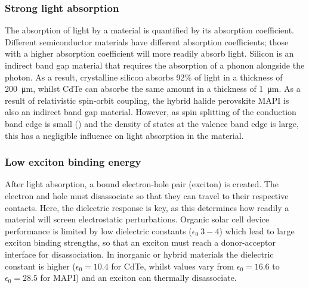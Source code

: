 \subsubsection{Strong light absorption}
The absorption of light by a material is quantified by its absorption coefficient. Different semiconductor materials have different absorption coefficients; those with a higher absorption coefficient will more readily absorb light. Silicon is an indirect band gap material that requires the absorption of a phonon alongside the photon. As a result, crystalline silicon absorbs 92\% of light in a thickness of  \SI{200}{\micro\metre}, whilst CdTe can absorbe the same amount in a thickness of \SI{1}{\micro\metre}.\autocite{Poortmans2006} As a result of relativistic spin-orbit coupling, the hybrid halide perovskite MAPI is also an indirect band gap material. However, as spin splitting of the conduction band edge is small () and the density of states at the valence band edge is large, this has a negligible influence on light absorption in the material.\autocite{Azarhoosh2016}

\subsubsection{Low exciton binding energy}
After light absorption, a bound electron-hole pair (exciton) is created. The electron and hole must disassociate so that they can travel to their respective contacts. Here, the dielectric response is key, as this determines how readily a material will screen electrostatic perturbations. Organic solar cell device performance is limited by low dielectric constants ($\epsilon_0 ~ 3-4$) which lead to large exciton binding strengths, so that an exciton must reach a donor-acceptor interface for disassociation.\autocite{Brebels2017} In inorganic or hybrid materials the dielectric constant is higher ($\epsilon_0=10.4$ for CdTe,\autocite{Madelung2004} whilst values vary from $\epsilon_0=16.6$ to $\epsilon_0=28.5$ for MAPI\autocite{Wilson2019}) and an exciton can thermally disassociate.

